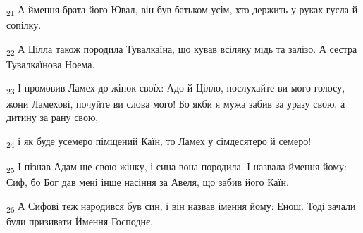 \begin{tcolorbox}
\textsubscript{21} А ймення брата його Ювал, він був батьком усім, хто держить у руках гусла й сопілку.
\end{tcolorbox}
\begin{tcolorbox}
\textsubscript{22} А Цілла також породила Тувалкаїна, що кував всіляку мідь та залізо. А сестра Тувалкаїнова Ноема.
\end{tcolorbox}
\begin{tcolorbox}
\textsubscript{23} І промовив Ламех до жінок своїх: Адо й Цілло, послухайте ви мого голосу, жони Ламехові, почуйте ви слова мого! Бо якби я мужа забив за уразу свою, а дитину за рану свою,
\end{tcolorbox}
\begin{tcolorbox}
\textsubscript{24} і як буде усемеро пімщений Каїн, то Ламех у сімдесятеро й семеро!
\end{tcolorbox}
\begin{tcolorbox}
\textsubscript{25} І пізнав Адам ще свою жінку, і сина вона породила. І назвала ймення йому: Сиф, бо Бог дав мені інше насіння за Авеля, що забив його Каїн.
\end{tcolorbox}
\begin{tcolorbox}
\textsubscript{26} А Сифові теж народився був син, і він назвав імення йому: Енош. Тоді зачали були призивати Ймення Господнє.
\end{tcolorbox}
